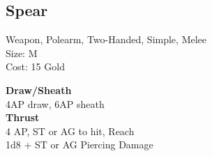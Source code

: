 \subsection{Spear}\label{weapon:spear}
Weapon, Polearm, Two-Handed, Simple, Melee\\
Size: M\\
Cost: 15 Gold

\textbf{Draw/Sheath}\\
4AP draw, 6AP sheath\\

\textbf{Thrust}\\
4 AP, ST or AG to hit,  Reach\\
1d8 + \texttimes ST or AG Piercing Damage

